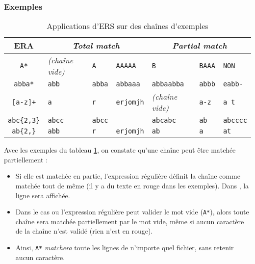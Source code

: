 \subsubsection{Exemples}
\vspace{-0.2cm}
\begin{table}[h!]
    \centering
    \begin{tabular}[c]{| c | l | l | l | l | l | l |}
        \hline
            \textbf{ERA}  & \multicolumn{3}{|c|}{\textbf{\textit{Total match}}}  & \multicolumn{3}{|c|}{\textbf{\textit{Partial match}}}  \\
            \hline
        \texttt{A*}                 & \footnotesize{\textit{(chaîne vide)}} &   \texttt{{\color{red}A}}     &  \texttt{{\color{red}AAAAA}}   &    \texttt{B}                     &   \texttt{B{\color{red}AAA}}  &   \texttt{NON}                   \\
            \hline
        \texttt{abba*}              & \texttt{{\color{red}abb}}             &   \texttt{{\color{red}abba}}  &  \texttt{{\color{red}abbaaa}}  &    \texttt{{\color{red}abbaa}bba} &   \texttt{{\color{red}abb}b}  &   \texttt{e{\color{red}abb}-}    \\
            \hline
        \texttt{[a-z]+}             & \texttt{{\color{red}a}}               &   \texttt{{\color{red}r}}     &  \texttt{{\color{red}erjomjh}} &    \textit{(chaîne vide)}         &   \texttt{{\color{red}a}-z}   &   \texttt{{\color{red}a} t}      \\
            \hline
        \texttt{abc\{2,3\}}         & \texttt{{\color{red}abcc}}            &   \texttt{{\color{red}abcc}}  &                                &    \texttt{abcabc}                &   \texttt{ab}                 &   \texttt{{\color{red}abccc}c}   \\
            \hline
        \texttt{ab\{2,\}}           & \texttt{{\color{red}abb}}             &   \texttt{{\color{red}r}}     &  \texttt{{\color{red}erjomjh}} &    \texttt{ab}                    &   \texttt{a}                  &   \texttt{at}                    \\
        \hline
    \end{tabular}
    \caption{Applications d'ERS sur des chaînes d'exemples}\label{tab:ERS_examples}
\end{table}

Avec les exemples du tableau \ref{tab:ERS_examples}, on constate qu'une chaîne peut être matchée partiellement :

\begin{itemize}
    \item Si elle est matchée en partie, l'expression régulière définit la chaîne comme matchée tout de même (il y a du texte en rouge dans les exemples). Dans , la ligne sera affichée.
    \item Dans le cas ou l'expression régulière peut valider le mot vide (\texttt{A*}), alors toute chaîne sera matchée partiellement par le mot vide, même si aucun caractère de la chaîne n'est validé (rien n'est en rouge).
    \item Ainsi, \texttt{A*} \textit{matchera} toute les lignes de n'importe quel fichier, sans retenir aucun caractère.
\end{itemize}


